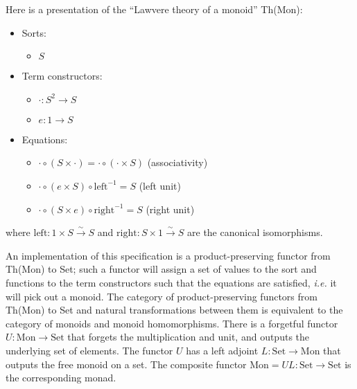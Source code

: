 \documentclass{article}
\newcommand{\maps}{\colon}
\newcommand{\Set}{\mathrm{Set}}
\newcommand{\Mon}{\mathrm{Mon}}
\newcommand{\leftu}{\mathrm{left}}
\newcommand{\rightu}{\mathrm{right}}
\begin{document}
Here is a presentation of the ``Lawvere theory of a monoid'' Th(Mon):\\
\begin{center}
  \begin{itemize}
    \item Sorts:
    \begin{itemize}
      \item $S$
    \end{itemize}
    \item Term constructors:
    \begin{itemize}
      \item $\cdot\maps S^2 \to S$
      \item $e\maps 1 \to S$
    \end{itemize}
    \item Equations:
    \begin{itemize}
      \item $\cdot \circ (S \times \cdot) = \cdot \circ (\cdot \times S)$ (associativity)
      \item $\cdot \circ (e \times S) \circ \leftu^{-1} = S$ (left unit)
      \item $\cdot \circ (S \times e) \circ \rightu^{-1} = S$ (right unit)        
    \end{itemize}
  \end{itemize}
\end{center}
where ${\leftu\maps 1 \times S \stackrel{\sim}{\to} S}$ and ${\rightu\maps S \times 1 \stackrel{\sim}{\to} S}$ are the canonical isomorphisms.

An implementation of this specification is a product-preserving functor from Th(Mon) to Set; such a functor will assign a set of values to the sort and functions to the term constructors such that the equations are satisfied, {\em i.e.} it will pick out a monoid.  The category of product-preserving functors from Th(Mon) to Set and natural transformations between them is equivalent to the category of monoids and monoid homomorphisms.  There is a forgetful functor $U\maps \Mon \to \Set$ that forgets the multiplication and unit, and outputs the underlying set of elements.  The functor $U$ has a left adjoint $L\maps \Set \to \Mon$ that outputs the free monoid on a set.  The composite functor $\Mon = UL\maps \Set \to \Set$ is the corresponding monad.
\end{document}
